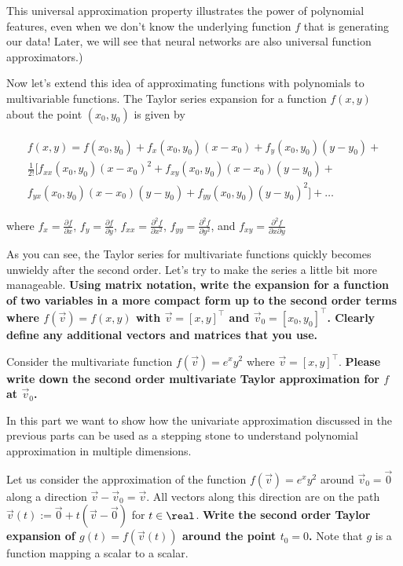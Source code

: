 \documentclass[preview]{standalone}
\begin{document}
\begin{Parts}
This universal approximation property illustrates the power of polynomial features, even when we don't know the underlying function $f$ that is generating our data! Later, we will see that neural networks are also universal function approximators.)





\Part Now let's extend this idea of approximating functions with polynomials to multivariable functions.  The Taylor series expansion for a function $f(x,y)$ about the point $(x_0,y_0)$ is given by

\begin{align}
\begin{split}
f(x,y)=f(x_0,y_0)+f_x(x_0,y_0)(x-x_0)+f_y(x_0,y_0)(y-y_0)+ \\
\frac{1}{2!}[f_{xx}(x_0,y_0)(x-x_0)^2+f_{xy}(x_0,y_0)(x-x_0)(y-y_0)+ \\
f_{yx}(x_0,y_0)(x-x_0)(y-y_0)+f_{yy}(x_0,y_0)(y-y_0)^2]+\ldots
\end{split}
\end{align}

where $f_x=\frac{\partial f}{\partial x}$, $f_y=\frac{\partial f}{\partial y}$, $f_{xx}=\frac{\partial^2f}{\partial x^2}$, $f_{yy}=\frac{\partial^2f}{\partial y^2}$, and $f_{xy}=\frac{\partial^2f}{\partial x \partial y}$

As you can see, the Taylor series for multivariate functions quickly becomes unwieldy after the second order.  Let's try to make the series a little bit more manageable.  {\bf Using matrix notation, write the expansion for a function of two variables in a more compact form up to the second order terms where $f(\vec{v})=f(x,y)$ with $\vec{v}=[x,y]^\top$ and $\vec{v}_0=[x_0,y_0]^\top$.  Clearly define any additional vectors and matrices that you use.}

Consider the multivariate function $f(\vec{v})=e^{x}y^2$ where $\vec{v}=[x,y]^\top$.
{\bf Please write down the second order multivariate Taylor approximation for $f$ at $\vec{v}_0$.}






\Part In this part we want to show how the univariate approximation
discussed in the previous parts can be used as a stepping stone to understand polynomial
approximation in multiple dimensions.


Let us consider the approximation of the function
$f(\vec{v}) = e^x y^2$ around $\vec{v}_0 = \vec{0}$ along a
direction $\vec{v} - \vec{v}_0 = \vec{v}$. All vectors along this
direction are on the path
$\vec{v}(t) := \vec{0}+ t(\vec{v}-\vec{0})$ for $t\in \real$. {\bf
  Write the second order Taylor expansion of $g(t) = f(\vec{v}(t))$
  around the point $t_0=0$.} Note that $g$ is a function mapping a
scalar to a scalar.


\end{Parts}
\end{document}
